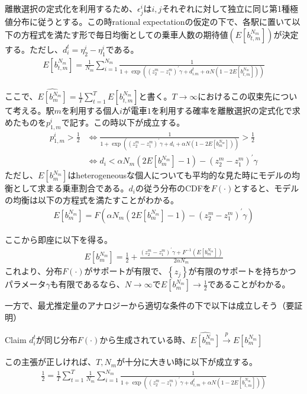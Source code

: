 \documentclass{jsarticle}
\begin{document}
離散選択の定式化を利用するため、$\epsilon_j^i$は$i, j$それぞれに対して独立に同じ第1種極値分布に従うとする。この時rational expectationの仮定の下で、各駅に置いて以下の方程式を満たす形で毎日均衡としての乗車人数の期待値$(E[b_{t,m}^{N_m}])$が決定する。ただし、$d_i^t = \eta_2^i - \eta_1^i$である。
\begin{align*}
	E[b_{t,m}^{N_m}] = \frac{1}{N_m} \sum_{i = 1}^{N_m} \frac{1}{1 + \exp\left( (z_2^m - z_1^m)^{'}\gamma + d_{i.m}^t + \alpha N \left(1 - 2E[b_{t,m}^{N_m}]\right) \right)}
\end{align*}

ここで、$\widehat{E[b_m^{N_m}]} = \frac{1}{T} \sum_{t = 1}^T E[b_{t,m}^{N_m}]$と書く。$T \to \infty$におけるこの収束先について考える。駅$m$を利用する個人$i$が電車$1$を利用する確率を離散選択の定式化で求めたものを$p_{1,m}^i$で記す。この時以下が成立する。
\begin{align*}
	p_{1,m}^i > \frac{1}{2} &\Leftrightarrow \frac{1}{1 + \exp\left( (z_2^m - z_1^m)^{'}\gamma + d_i + \alpha N \left(1 - 2E[b_m^{N_m}]\right) \right)} > \frac{1}{2}\\[8pt]
	&\Leftrightarrow d_i < \alpha N_m \left(2E[b_m^{N_m}] - 1\right) - (z_2^m - z_1^m)^{'}\gamma
\end{align*}
ただし、$E[b_m^{N_m}]$はheterogeneousな個人についても平均的な見た時にモデルの均衡として求まる乗車割合である。$d_i$の従う分布のCDFを$F(\cdot)$とすると、モデルの均衡は以下の方程式を満たすことがわかる。
\begin{align*}
	E[b_m^{N_m}] = F\left( \alpha N_m \left(2E[b_m^{N_m}] - 1\right) - (z_2^m - z_1^m)^{'}\gamma \right)
\end{align*}

ここから即座に以下を得る。
\begin{align*}
	E[b_m^{N_m}] = \frac{1}{2} + \frac{(z_2^m - z_1^m)^{'}\gamma + F^{-1} \left( E[b_m^{N_m}] \right)}{2\alpha N_m}
\end{align*}
これより、分布$F(\cdot)$がサポートが有限で、$\left\{ z_j \right\}$が有限のサポートを持ちかつパラメータ$\gamma$も有限であるなら、$N \to \infty$で$E[b_m^{N_m}] \to \frac{1}{2}$であることがわかる。

一方で、最尤推定量のアナロジーから適切な条件の下で以下は成立しそう（要証明）
\begin{itembox}[l]{Claim}
	$d_i^t$が同じ分布$F(\cdot)$から生成されている時、$\widehat{E[b_m^{N_m}]} \xrightarrow[]{p} E[b_m^{N_m}]$
\end{itembox}
この主張が正しければ、$T,N_m$が十分に大きい時に以下が成立する。
\begin{align*}
	\frac{1}{2} = \frac{1}{T}\sum_{t = 1}^T \frac{1}{N_m}\sum_{i = 1}^{N_m} \frac{1}{1 + \exp\left( (z_2^m - z_1^m)^{'}\gamma + d_{i,m}^t + \alpha N \left(1 - 2E[b_{t,m}^{N_m}]\right) \right)}
\end{align*}
\end{document}

